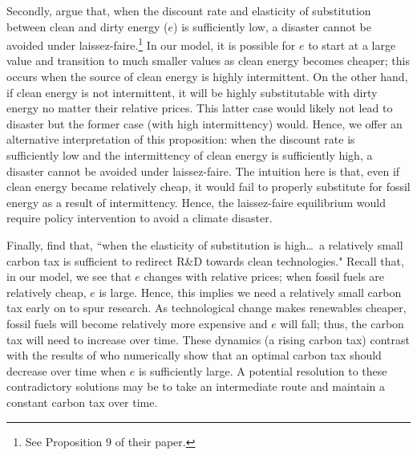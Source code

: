 \documentclass[11pt,a4paper]{extarticle}
\begin{document}
Secondly, \citeauthor{Ace2012} argue that, when the discount rate and elasticity of substitution between clean and dirty energy ($e$) is sufficiently low, a disaster cannot be avoided under laissez-faire.\footnote{ See Proposition 9 of their paper.} In our model, it is possible for $e$ to start at a large value and transition to much smaller values as clean energy becomes cheaper; this occurs when the source of clean energy is highly intermittent.  On the other hand, if clean energy is not intermittent, it will be highly substitutable with dirty energy no matter their relative prices. This latter case would likely not lead to disaster but the former case (with high intermittency) would. Hence, we offer an alternative interpretation of this proposition: when the discount rate is sufficiently low and the intermittency of clean energy is sufficiently high, a disaster cannot be avoided under laissez-faire. The intuition here is that, even if clean energy became relatively cheap, it would fail to properly substitute  for fossil energy as a result of intermittency. Hence, the laissez-faire equilibrium would require policy intervention to avoid a climate disaster. 

Finally, \citeauthor{Ace2012} find that, ``when the elasticity
of substitution is high\dots\, a relatively small carbon tax is sufficient to
redirect R\&D towards clean technologies." Recall that, in our model, we see that $e$ changes with relative prices; when fossil fuels are relatively cheap, $e$ is large. Hence, this implies we need a relatively small carbon tax early on to spur research. As technological change makes renewables cheaper, fossil fuels will become relatively more expensive and $e$ will fall; thus, the carbon tax will need to increase over time. These dynamics (a rising carbon tax) contrast with the results of \citeauthor{Ace2012} who numerically show that an optimal carbon tax should decrease over time when $e$ is sufficiently large. A potential resolution to these contradictory solutions may be to take an intermediate route and maintain a constant carbon tax over time. 
\end{document}
